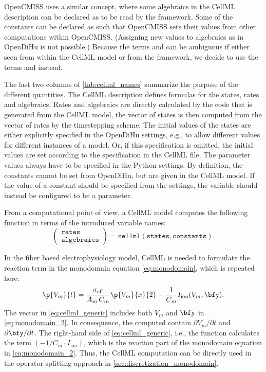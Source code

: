 OpenCMISS uses a similar concept, where some algebraics in the CellML description can be declared as  to be read by the framework. Some of the constants can be declared as  such that OpenCMISS sets their values from other computations within OpenCMISS. (Assigning new values to algebraics as in OpenDiHu is not possible.) Because the terms  and  can be ambiguous if either seen from within the CellML model or from the framework, we decide to use the terms  and  instead.

The last two columns of \cref{tab:cellml_names} summarize the purpose of the different quantities. The CellML description defines formulas for the states, rates and algebraics. Rates and algebraics are directly calculated by the code that is generated from the CellML model, the vector of states is then computed from the vector of rates by the timestepping scheme. The initial values of the states are either explicitly specified in the OpenDiHu settings, e.g., to allow different values for different instances of a model. Or, if this specification is omitted,  the initial values are set according to the specification in the CellML file. The parameter values always have to be specified in the Python settings. By definition, the constants cannot be set from OpenDiHu, but are given in the CellML model. If the value of a constant should be specified from the settings, the variable should instead be configured to be a parameter.


From a computational point of view, a CellML model computes the following function in terms of the introduced variable names:
\begin{equation}
  \left(
    \begin{array}{cc}
      \texttt{rates} \\ \texttt{algebraics} 
    \end{array}
  \right) = \texttt{cellml}\left(\texttt{states}, \texttt{constants}\right).
  \label{eq:cellml_generic}
\end{equation}

In the fiber based electrophysiology model, CellML is needed to formulate the reaction term in the monodomain equation \cref{eq:monodomain}, which is repeated here:
\begin{align}\label{eq:monodomain_2}
  \p{V_m}{t}  = \dfrac{\sigma_\text{eff}}{A_m\,C_m} \p{V_m}{x}{2} - \dfrac{1}{C_m} I_\text{ion}(V_m,\bfy).
\end{align}
The  vector in \cref{eq:cellml_generic} includes both $V_m$ and $\bfy$ in \cref{eq:monodomain_2}. In consequence, the computed  contain $\partial V_m/\partial t$ and $\partial\bfy/\partial t$. The right-hand side of \cref{eq:cellml_generic}, i.e., the  function calculates the term $(-1/C_m \cdot I_\text{ion})$, which is the reaction part of the monodomain equation in \cref{eq:monodomain_2}. Thus, the CellML computation can be directly used in the operator splitting approach in \cref{sec:discretization_monodomain}.

